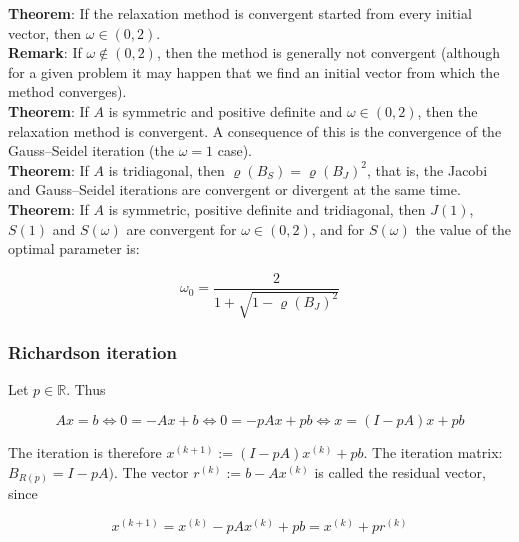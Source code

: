 \documentclass[margin=0px]{article}
\begin{document}
\noindent \textbf{Theorem}: If the relaxation method is convergent started from every initial vector, then $\omega \in (0,2)$.\\

\noindent \textbf{Remark}: If $\omega \notin (0,2)$, then the method is generally not convergent (although for a given problem it may happen
that we find an initial vector from which the method converges).\\

\noindent \textbf{Theorem}: If $A$ is symmetric and positive definite and $\omega \in (0, 2)$, then the relaxation method is convergent. A
consequence of this is the convergence of the Gauss--Seidel iteration (the $\omega = 1$ case).\\

\noindent \textbf{Theorem}: If $A$ is tridiagonal, then $\varrho(B_{S}) = \varrho(B_{J})^{2}$, that is, the Jacobi and Gauss--Seidel iterations are
convergent or divergent at the same time.\\

\noindent \textbf{Theorem}: If $A$ is symmetric, positive definite and tridiagonal, then $J(1)$, $S(1)$ and $S(\omega)$ are convergent for $\omega \in (0, 2)$,
and for $S(\omega)$ the value of the optimal parameter is:

\begin{displaymath}
    \omega_{0} = \frac{2}{1 + \sqrt{1 - \varrho(B_{J})^{2}}}
\end{displaymath}

\subsubsection{Richardson iteration}

Let $p \in \mathbb{R}$. Thus

\begin{displaymath}
    Ax = b \Longleftrightarrow
    0 = -Ax + b \Longleftrightarrow
    0 = -pAx + pb \Longleftrightarrow
    x = (I-pA)x +pb
\end{displaymath}

The iteration is therefore $x^{(k+1)} := (I-pA)x^{(k)} +pb$. The iteration matrix: $B_{R(p)} = I-pA)$. The
vector $r^{(k)} := b - Ax^{(k)} $ is called the residual vector, since

\begin{displaymath}
    x^{(k+1)} = x^{(k)} - pAx^{(k)} + pb = x^{(k)} + pr^{(k)}
\end{displaymath}
\end{document}
